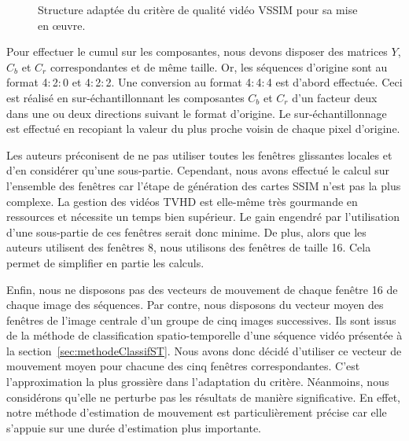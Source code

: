 \begin{figure}[htbp]
	\centering
	\begin{tikzpicture}[text centered, text width=2cm,node distance=3cm]\end{tikzpicture}
	\caption{Structure adaptée du critère de qualité vidéo VSSIM pour sa mise en \oe uvre.}
	\label{fig:vssimMod}
\end{figure}

Pour effectuer le cumul sur les composantes, nous devons disposer des matrices $Y$, $C_b$ et $C_r$ correspondantes et de même taille. Or, les séquences d'origine sont au format 4$:$2$:$0 et 4$:$2$:$2. Une conversion au format 4$:$4$:$4 est d'abord effectuée. Ceci est réalisé en sur-échantillonnant les composantes $C_b$ et $C_r$ d'un facteur deux dans une ou deux directions suivant le format d'origine. Le sur-échantillonnage est effectué en recopiant la valeur du plus proche voisin de chaque pixel d'origine.

Les auteurs préconisent de ne pas utiliser toutes les fenêtres glissantes locales et d'en considérer qu'une sous-partie. Cependant, nous avons effectué le calcul sur l'ensemble des fenêtres car l'étape de génération des cartes SSIM n'est pas la plus complexe. La gestion des vidéos TVHD est elle-même très gourmande en ressources et nécessite un temps bien supérieur. Le gain engendré par l'utilisation d'une sous-partie de ces fenêtres serait donc minime. De plus, alors que les auteurs utilisent des fenêtres 8, nous utilisons des fenêtres de taille 16. Cela permet de simplifier en partie les calculs.

Enfin, nous ne disposons pas des vecteurs de mouvement de chaque fenêtre 16 de chaque image des séquences. Par contre, nous disposons du vecteur moyen des fenêtres de l'image centrale d'un groupe de cinq images successives. Ils sont issus de la méthode de classification spatio-temporelle d'une séquence vidéo présentée à la section~\ref{sec:methodeClassifST}. Nous avons donc décidé d'utiliser ce vecteur de mouvement moyen pour chacune des cinq fenêtres correspondantes. C'est l'approximation la plus grossière dans l'adaptation du critère. Néanmoins, nous considérons qu'elle ne perturbe pas les résultats de manière significative. En effet, notre méthode d'estimation de mouvement est particulièrement précise car elle s'appuie sur une durée d'estimation plus importante. %


